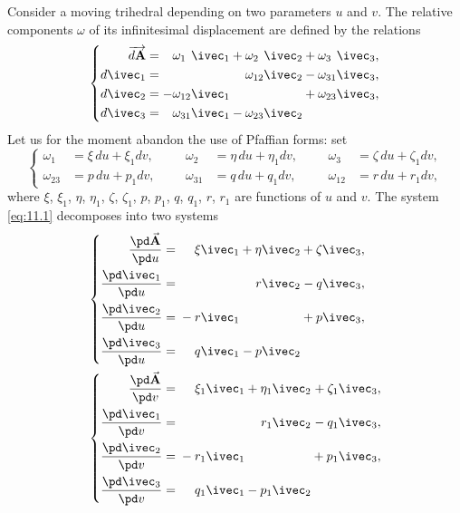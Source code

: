 Consider a moving trihedral depending on two parameters $u$ and $v$. The relative components $\omega$ of its infinitesimal displacement are defined by the relations
\begin{equation}
  \label{eq:11.1}
  \left\{
    \begin{alignedat}{20}
      \overrightarrow{d\mathbf{A}}&{}={}&\omega_{1\phantom{0}}\ivec_{1}&&{}+{}\omega_{2\phantom{0}}\ivec_{2}&&{}+{}\omega_{3\phantom{0}}\ivec_{3},\\
      d\ivec_{1}&{}={}&&&\omega_{12}\ivec_{2}&&{}-{}\omega_{31}\ivec_{3},\\
      d\ivec_{2}&{}={}&-\omega_{12}\ivec_{1}&&&&{}+{}\omega_{23}\ivec_{3},\\
      d\ivec_{3}&{}={}&\omega_{31}\ivec_{1}&&{}-{}\omega_{23}\ivec_{2}
    \end{alignedat}
  \right.
\end{equation}
Let us for the moment abandon the use of Pfaffian forms: set
\begin{equation}
  \label{eq:11.2}
  \left\{
    \begin{aligned}
      \omega_{1\phantom{0}}&=\xi\,du+\xi_{1}dv,&&&\omega_{2\phantom{0}}&=\eta\,du+\eta_{1}dv,&&&\omega_{3\phantom{0}}&=\zeta\,du+\zeta_{1}dv,\\
      \omega_{23}&=p\,du+p_{1}dv,&&&\omega_{31}&=q\,du+q_{1}dv,&&&\omega_{12}&=r\,du+r_{1}dv,
    \end{aligned}
  \right.
\end{equation}
where $\xi$, $\xi_{1}$, $\eta$, $\eta_{1}$, $\zeta$, $\zeta_{1}$, $p$, $p_{1}$, $q$, $q_{1}$, $r$, $r_{1}$ are functions of $u$ and $v$. The system \eqref{eq:11.1} decomposes into two systems
\begin{align}
  \label{eq:11.3}
  &  \left\{
    \begin{alignedat}{20}
      \frac{\pd\vec{\mathbf{A}}}{\pd u}&{}={}&\xi\ivec_{1}&&{}+{}\eta\ivec_{2}&&{}+{}\zeta\ivec_{3},\\
      \frac{\pd\ivec_{1}}{\pd u}&{}={}&&&r\ivec_{2}&&{}-{}q\ivec_{3},\\
      \frac{\pd\ivec_{2}}{\pd u}&{}={}&{}-{}r\ivec_{1}&&&&{}+{}p\ivec_{3},\\
      \frac{\pd\ivec_{3}}{\pd u}&{}={}&q\ivec_{1}&&{}-{}p\ivec_{2}
    \end{alignedat}
  \right.
  \\
  \label{eq:11.4}
  &  \left\{
    \begin{alignedat}{20}
      \frac{\pd\vec{\mathbf{A}}}{\pd v}&{}={}&\xi_{1}\ivec_{1}&&{}+{}\eta_{1}\ivec_{2}&&{}+{}\zeta_{1}\ivec_{3},\\
      \frac{\pd\ivec_{1}}{\pd v}&{}={}&&&r_{1}\ivec_{2}&&{}-{}q_{1}\ivec_{3},\\
      \frac{\pd\ivec_{2}}{\pd v}&{}={}&{}-{}r_{1}\ivec_{1}&&&&{}+{}p_{1}\ivec_{3},\\
      \frac{\pd\ivec_{3}}{\pd v}&{}={}&q_{1}\ivec_{1}&&{}-{}p_{1}\ivec_{2}
    \end{alignedat}
  \right.
\end{align}
